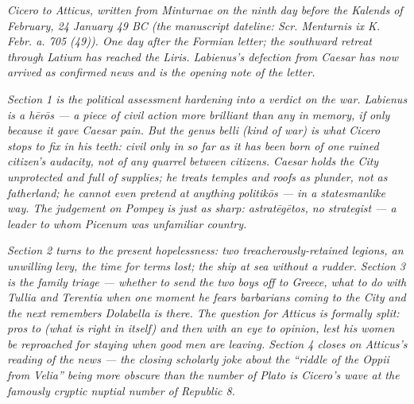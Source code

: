 
\textit{Cicero to Atticus, written from Minturnae on
the ninth day before the Kalends of February,
24 January 49 BC (the manuscript dateline:
\textit{Scr. Menturnis ix K. Febr. a. 705 (49)}). One
day after the Formian letter; the southward retreat
through Latium has reached the Liris. Labienus's defection
from Caesar has now arrived as confirmed news and is the
opening note of the letter.}

\textit{Section 1 is the political assessment hardening
into a verdict on the war. Labienus is a \emph{hērōs}
--- a piece of civil action more brilliant than any in
memory, if only because it gave Caesar pain. But the
\emph{genus belli} (kind of war) is what Cicero stops to
fix in his teeth: civil only in so far as it has been
born of one ruined citizen's audacity, not of any quarrel
between citizens. Caesar holds the City unprotected and
full of supplies; he treats temples and roofs as plunder,
not as fatherland; he cannot even pretend at anything
\emph{politikōs} --- in a statesmanlike way. The judgement
on Pompey is just as sharp: \emph{astratēgētos}, no
strategist --- a leader to whom Picenum was unfamiliar
country.}

\textit{Section 2 turns to the present hopelessness: two
treacherously-retained legions, an unwilling levy, the
time for terms lost; the ship at sea without a rudder.
Section 3 is the family triage --- whether to send the
two boys off to Greece, what to do with Tullia and
Terentia when one moment he fears barbarians coming to
the City and the next remembers Dolabella is there. The
question for Atticus is formally split: \emph{pros to}
(what is right in itself) and then with an eye to opinion,
lest his women be reproached for staying when good men
are leaving. Section 4 closes on Atticus's reading of the
news --- the closing scholarly joke about the ``riddle of
the Oppii from Velia'' being more obscure than the number
of Plato is Cicero's wave at the famously cryptic
\emph{nuptial number} of \emph{Republic} 8.}
